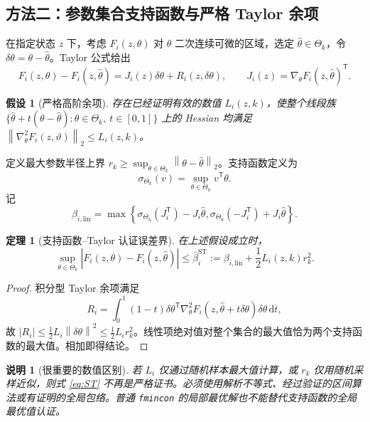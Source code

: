 \documentclass[journal,onecolumn]{IEEEtran}
\newtheorem{assumption}{假设}[section]
\newtheorem{theorem}{定理}[section]
\newtheorem{remark}{说明}[section]
\newcommand{\dd}{\mathrm d}
\newcommand{\norm}[1]{\left\lVert#1\right\rVert}
\newcommand{\abs}[1]{\left\lvert#1\right\rvert}
\newcommand{\tr}{\mathsf T}
\begin{document}
\subsection{方法二：参数集合支持函数与严格 Taylor 余项}
在指定状态 $z$ 下，考虑 $F_i(z,\theta)$ 对 $\theta$ 二次连续可微的区域，选定 $\hat\theta\in\Theta_k$，令 $\delta\theta=\theta-\hat\theta$。Taylor 公式给出
\begin{equation}
 F_i(z,\theta)-F_i(z,\hat\theta)
 =J_i(z)\delta\theta+R_i(z,\delta\theta),\qquad
 J_i(z)=\nabla_\theta F_i(z,\hat\theta)^\tr.
\end{equation}
\begin{assumption}[严格高阶余项]
存在\emph{已经证明有效}的数值 $L_i(z,k)$，使整个线段族
$\{\hat\theta+t(\theta-\hat\theta):\theta\in\Theta_k,\ t\in[0,1]\}$
上的 Hessian 均满足 $\norm{\nabla_\theta^2F_i(z,\vartheta)}_2\le L_i(z,k)$。
\end{assumption}
定义最大参数半径上界 $r_k\ge\sup_{\theta\in\Theta_k}\norm{\theta-\hat\theta}_2$。支持函数定义为
\begin{equation}
 \sigma_{\Theta_k}(v)=\sup_{\theta\in\Theta_k}v^\tr\theta.
\end{equation}
记
\begin{equation}
 \beta_{i,\mathrm{lin}}=\max\left\{\sigma_{\Theta_k}(J_i^\tr)-J_i\hat\theta,
 \sigma_{\Theta_k}(-J_i^\tr)+J_i\hat\theta\right\}.
\end{equation}
\begin{theorem}[支持函数--Taylor 认证误差界]
在上述假设成立时，
\begin{equation}
 \boxed{\sup_{\theta\in\Theta_k}\abs{F_i(z,\theta)-F_i(z,\hat\theta)}\le
 \bar\beta_i^{\mathrm{ST}}:=\beta_{i,\mathrm{lin}}+\frac12L_i(z,k)r_k^2.}
 \label{eq:ST}
\end{equation}
\end{theorem}
\begin{proof}
积分型 Taylor 余项满足
\begin{equation*}
 R_i=\int_0^1(1-t)\delta\theta^\tr\nabla_\theta^2F_i(z,\hat\theta+t\delta\theta)\delta\theta\,\dd t,
\end{equation*}
故 $|R_i|\le\tfrac12L_i\norm{\delta\theta}^2\le\tfrac12L_ir_k^2$。线性项绝对值对整个集合的最大值恰为两个支持函数的最大值。相加即得结论。
\end{proof}
\begin{remark}[很重要的数值区别]
若 $L_i$ 仅通过随机样本最大值计算，或 $r_k$ 仅用随机采样近似，则式 \eqref{eq:ST} 不再是严格证书。必须使用解析不等式、经过验证的区间算法或有证明的全局包络。普通 \texttt{fmincon} 的局部最优解也不能替代支持函数的全局最优值认证。
\end{remark}
\end{document}
